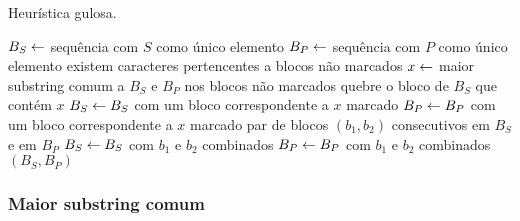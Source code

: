     \begin{algorithm}
        \caption{Heurística gulosa.} \label{alg:greedy}
        \begin{codebox}
        \li $B_S \leftarrow$ sequência com $S$ como único elemento
        \li $B_P \leftarrow$ sequência com $P$ como único elemento
        \li \Enquanto existem caracteres pertencentes a blocos não marcados \Faca
            \Do
        \li     $x \leftarrow$ maior substring comum a $B_S$ e $B_P$ nos blocos não marcados
        \li     quebre o bloco de $B_S$ que contém $x$
        \li     $B_S \leftarrow B_S$ com um bloco correspondente a $x$ marcado
        \li     $B_P \leftarrow B_P$ com um bloco correspondente a $x$ marcado
            \End
        \li \Para \Cada par de blocos $(b_1, b_2)$ consecutivos em $B_S$ e em $B_P$ \Faca
            \Do
        \li     $B_S \leftarrow B_S$ com $b_1$ e $b_2$ combinados
        \li     $B_P \leftarrow B_P$ com $b_1$ e $b_2$ combinados
            \End
        \li \Devolva $(B_S, B_P)$
        \end{codebox}
    \end{algorithm}

    \subsubsection{Maior substring comum}

